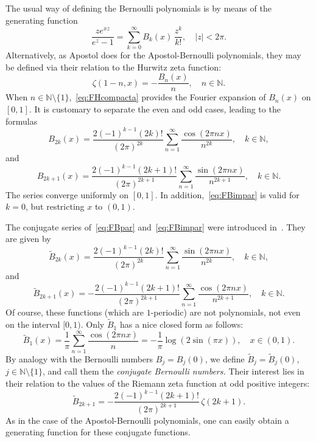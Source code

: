 \documentclass[11pt,a4paper,reqno]{amsart}
\newcommand{\N}{\mathbb{N}}
\newcommand{\R}{\mathbb{R}}
\let\tilde\widetilde
\theoremstyle{plain}
\theoremstyle{remark}
\numberwithin{equation}{section}
\begin{document}
The usual way of defining the Bernoulli polynomials is by means of the generating function
\begin{equation*}
  \frac{z e^{xz}}{e^z-1} = \sum_{k=0}^\infty B_k(x)\, \frac{z^k}{k!},
  \quad |z| < 2\pi.
\end{equation*}
Alternatively, as Apostol does for the Apostol-Bernoulli polynomials, they may be defined via their relation to the Hurwitz zeta function:
\begin{equation*}
  \zeta(1-n,x) = -\frac{B_n(x)}{n},
  \quad n\in \N.
\end{equation*}
When $n\in \N \setminus\{1\}$,~\eqref{eq:FHcompacta} provides the Fourier expansion of $B_n(x)$ on $[0,1]$. It is customary to separate the even and odd cases, leading to the formulas
\begin{equation}
  \label{eq:FBpar}
  B_{2k}(x) = \frac{2(-1)^{k-1}(2k)!}{(2\pi)^{2k}} \sum_{n=1}^\infty \frac{\cos(2\pi n x)}{n^{2k}},
  \quad k\in \N,
\end{equation}
and
\begin{equation}
\label{eq:FBimpar}
  B_{2k+1}(x) = \frac{2(-1)^{k-1}(2k+1)!}{(2\pi)^{2k+1}} \sum_{n=1}^\infty \frac{\sin(2\pi n x)}{n^{2k+1}},
  \quad k\in \N.
\end{equation}
The series converge uniformly on $[0,1]$. In addition,~\eqref{eq:FBimpar} is valid for $k=0$, but restricting $x$ to $(0,1)$.

The conjugate series of~\eqref{eq:FBpar} and~\eqref{eq:FBimpar} were introduced in~\cite{Ha}. They are given by
\begin{equation}
  \tilde{B}_{2k}(x) = \frac{2(-1)^{k-1}(2k)!}{(2\pi)^{2k}} 
  \sum_{n=1}^\infty \frac{\sin(2\pi n x)}{n^{2k}},
  \quad k\in \N,
\end{equation}
and
\begin{equation}
  \tilde{B}_{2k+1}(x) = -\frac{2(-1)^{k-1}(2k+1)!}{(2\pi)^{2k+1}} 
  \sum_{n=1}^\infty \frac{\cos(2\pi n x)}{n^{2k+1}},
  \quad k\in \N.
\end{equation}
Of course, these functions (which are $1$-periodic) are not polynomials, not even on the interval $[0,1)$. Only $\tilde{B}_1$ has a nice closed form as follows:
\begin{equation*}
  \tilde{B}_{1}(x) = \frac{1}{\pi} \sum_{n=1}^\infty \frac{\cos(2\pi nx)}{n}
  = -\frac{1}{\pi}\log(2\sin(\pi x)),
  \quad x\in (0,1).
\end{equation*}
By analogy with the Bernoulli numbers $B_{j}=B_{j}(0)$, we define $\tilde{B}_{j}=\tilde{B}_{j}(0)$, $j\in \N \setminus\{1\}$, and call them the \emph{conjugate Bernoulli numbers.} Their interest lies in their relation to the values of the Riemann zeta function at odd positive integers:
\begin{equation*}
  \tilde{B}_{2k+1} = -\frac{2(-1)^{k-1}(2k+1)!}{(2\pi)^{2k+1}} \, \zeta(2k+1).
\end{equation*}
As in the case of the Apostol-Bernoulli polynomials, one can easily obtain a generating function for these conjugate functions.
\end{document}
